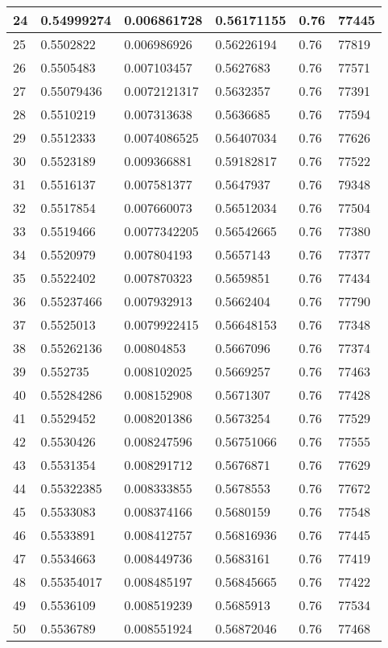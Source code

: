 \begin{longtable}{|l|l|l|l|l|l|}
24 & 0.54999274 & 0.006861728 & 0.56171155 & 0.76 & 77445 \\ \hline 
25 & 0.5502822 & 0.006986926 & 0.56226194 & 0.76 & 77819 \\ \hline 
26 & 0.5505483 & 0.007103457 & 0.5627683 & 0.76 & 77571 \\ \hline 
27 & 0.55079436 & 0.0072121317 & 0.5632357 & 0.76 & 77391 \\ \hline 
28 & 0.5510219 & 0.007313638 & 0.5636685 & 0.76 & 77594 \\ \hline 
29 & 0.5512333 & 0.0074086525 & 0.56407034 & 0.76 & 77626 \\ \hline 
30 & 0.5523189 & 0.009366881 & 0.59182817 & 0.76 & 77522 \\ \hline 
31 & 0.5516137 & 0.007581377 & 0.5647937 & 0.76 & 79348 \\ \hline 
32 & 0.5517854 & 0.007660073 & 0.56512034 & 0.76 & 77504 \\ \hline 
33 & 0.5519466 & 0.0077342205 & 0.56542665 & 0.76 & 77380 \\ \hline 
34 & 0.5520979 & 0.007804193 & 0.5657143 & 0.76 & 77377 \\ \hline 
35 & 0.5522402 & 0.007870323 & 0.5659851 & 0.76 & 77434 \\ \hline 
36 & 0.55237466 & 0.007932913 & 0.5662404 & 0.76 & 77790 \\ \hline 
37 & 0.5525013 & 0.0079922415 & 0.56648153 & 0.76 & 77348 \\ \hline 
38 & 0.55262136 & 0.00804853 & 0.5667096 & 0.76 & 77374 \\ \hline 
39 & 0.552735 & 0.008102025 & 0.5669257 & 0.76 & 77463 \\ \hline 
40 & 0.55284286 & 0.008152908 & 0.5671307 & 0.76 & 77428 \\ \hline 
41 & 0.5529452 & 0.008201386 & 0.5673254 & 0.76 & 77529 \\ \hline 
42 & 0.5530426 & 0.008247596 & 0.56751066 & 0.76 & 77555 \\ \hline 
43 & 0.5531354 & 0.008291712 & 0.5676871 & 0.76 & 77629 \\ \hline 
44 & 0.55322385 & 0.008333855 & 0.5678553 & 0.76 & 77672 \\ \hline 
45 & 0.5533083 & 0.008374166 & 0.5680159 & 0.76 & 77548 \\ \hline 
46 & 0.5533891 & 0.008412757 & 0.56816936 & 0.76 & 77445 \\ \hline 
47 & 0.5534663 & 0.008449736 & 0.5683161 & 0.76 & 77419 \\ \hline 
48 & 0.55354017 & 0.008485197 & 0.56845665 & 0.76 & 77422 \\ \hline 
49 & 0.5536109 & 0.008519239 & 0.5685913 & 0.76 & 77534 \\ \hline 
50 & 0.5536789 & 0.008551924 & 0.56872046 & 0.76 & 77468 \\ \hline 
\end{longtable}
